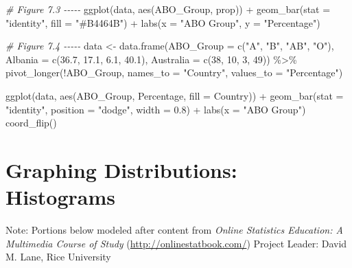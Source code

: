 \documentclass[
]{book}
\newenvironment{Shaded}{\begin{snugshade}}{\end{snugshade}}
\newcommand{\AttributeTok}[1]{\textcolor[rgb]{0.77,0.63,0.00}{#1}}
\newcommand{\CommentTok}[1]{\textcolor[rgb]{0.56,0.35,0.01}{\textit{#1}}}
\newcommand{\DecValTok}[1]{\textcolor[rgb]{0.00,0.00,0.81}{#1}}
\newcommand{\FloatTok}[1]{\textcolor[rgb]{0.00,0.00,0.81}{#1}}
\newcommand{\FunctionTok}[1]{\textcolor[rgb]{0.00,0.00,0.00}{#1}}
\newcommand{\NormalTok}[1]{#1}
\newcommand{\OtherTok}[1]{\textcolor[rgb]{0.56,0.35,0.01}{#1}}
\newcommand{\SpecialCharTok}[1]{\textcolor[rgb]{0.00,0.00,0.00}{#1}}
\newcommand{\StringTok}[1]{\textcolor[rgb]{0.31,0.60,0.02}{#1}}
\begin{document}
\begin{Shaded}
\begin{Highlighting}[]
\CommentTok{\# Figure 7.3 {-}{-}{-}{-}{-}}
\FunctionTok{ggplot}\NormalTok{(data, }\FunctionTok{aes}\NormalTok{(ABO\_Group, prop)) }\SpecialCharTok{+} 
  \FunctionTok{geom\_bar}\NormalTok{(}\AttributeTok{stat =} \StringTok{"identity"}\NormalTok{, }\AttributeTok{fill =} \StringTok{"\#B4464B"}\NormalTok{) }\SpecialCharTok{+} 
  \FunctionTok{labs}\NormalTok{(}\AttributeTok{x =} \StringTok{"ABO Group"}\NormalTok{, }\AttributeTok{y =} \StringTok{"Percentage"}\NormalTok{)}

\CommentTok{\# Figure 7.4 {-}{-}{-}{-}{-}}
\NormalTok{data }\OtherTok{\textless{}{-}} \FunctionTok{data.frame}\NormalTok{(}\AttributeTok{ABO\_Group =} \FunctionTok{c}\NormalTok{(}\StringTok{"A"}\NormalTok{, }\StringTok{"B"}\NormalTok{, }\StringTok{"AB"}\NormalTok{, }\StringTok{"O"}\NormalTok{), }
                   \AttributeTok{Albania =} \FunctionTok{c}\NormalTok{(}\FloatTok{36.7}\NormalTok{, }\FloatTok{17.1}\NormalTok{, }\FloatTok{6.1}\NormalTok{, }\FloatTok{40.1}\NormalTok{), }
                   \AttributeTok{Australia =} \FunctionTok{c}\NormalTok{(}\DecValTok{38}\NormalTok{, }\DecValTok{10}\NormalTok{, }\DecValTok{3}\NormalTok{, }\DecValTok{49}\NormalTok{)) }\SpecialCharTok{\%\textgreater{}\%}
  \FunctionTok{pivot\_longer}\NormalTok{(}\SpecialCharTok{!}\NormalTok{ABO\_Group, }\AttributeTok{names\_to =} \StringTok{"Country"}\NormalTok{, }\AttributeTok{values\_to =} \StringTok{"Percentage"}\NormalTok{)}

\FunctionTok{ggplot}\NormalTok{(data, }\FunctionTok{aes}\NormalTok{(ABO\_Group, Percentage, }\AttributeTok{fill =}\NormalTok{ Country)) }\SpecialCharTok{+} 
  \FunctionTok{geom\_bar}\NormalTok{(}\AttributeTok{stat =} \StringTok{"identity"}\NormalTok{, }\AttributeTok{position =} \StringTok{"dodge"}\NormalTok{, }\AttributeTok{width =} \FloatTok{0.8}\NormalTok{) }\SpecialCharTok{+} 
  \FunctionTok{labs}\NormalTok{(}\AttributeTok{x =} \StringTok{"ABO Group"}\NormalTok{)}
  \FunctionTok{coord\_flip}\NormalTok{()}
\end{Highlighting}
\end{Shaded}

\hypertarget{graphing-distributions-histograms}{%
\chapter{Graphing Distributions: Histograms}\label{graphing-distributions-histograms}}

Note: Portions below modeled after content from
\emph{Online Statistics Education: A Multimedia Course of Study}
(\url{http://onlinestatbook.com/}) Project Leader: David M. Lane, Rice University
\end{document}
